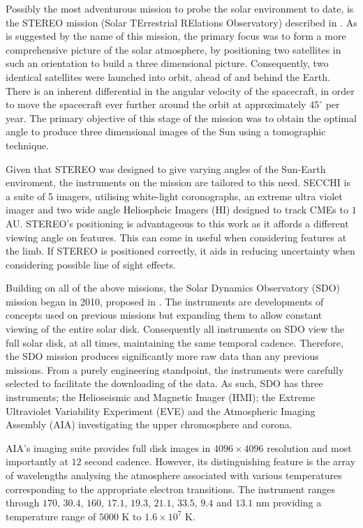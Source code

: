 Possibly the most adventurous mission to probe the solar environment to date, is the STEREO mission (Solar TErrestrial RElations Observatory) described in \cite{Kaiser2008}.
As is suggested by the name of this mission, the primary focus was to form a more comprehensive picture of the solar atmosphere, by positioning two satellites in such an orientation to build a three dimensional picture.
Consequently, two identical satellites were launched into orbit, ahead of and behind the Earth.
There is an inherent differential in the angular velocity of the spacecraft, in order to move the spacecraft ever further around the orbit at approximately $45^\circ$ per year.
The primary objective of this stage of the mission was to obtain the optimal angle to produce three dimensional images of the Sun using a tomographic technique.

Given that STEREO was designed to give varying angles of the Sun-Earth  enviroment, the instruments on the mission are tailored to this need.
SECCHI is a suite of 5 imagers, utilising white-light coronographs, an extreme ultra violet imager and two wide angle Heliospheic Imagers (HI) designed to track CMEs to $1$ AU.
STEREO's positioning is advantageous to this work as it affords a different viewing angle on features.
This can come in useful when considering features at the limb.
If STEREO is positioned correctly, it aids in reducing uncertainty when considering possible line of sight effects.

Building on all of the above missions, the Solar Dynamics Observatory (SDO) mission began in 2010, proposed in \cite{Pesnell2012}.
The instruments are developments of concepts used on previous missions but expanding them to allow constant viewing of the entire solar disk.
Consequently all instruments on SDO view the full solar disk, at all times, maintaining the same temporal cadence. 
Therefore, the SDO mission produces significantly more raw data than any previous missions.
From a purely engineering standpoint, the instruments were carefully selected to facilitate the downloading of the data.
As such, SDO has three instruments; the Helioseismic and Magnetic Imager (HMI); the Extreme Ultraviolet Variability Experiment (EVE) and the Atmospheric Imaging Assembly (AIA) investigating the upper chromosphere and corona.

AIA's imaging suite provides full disk images in $4096 \times 4096$ resolution and most importantly at $12$ second cadence.
However, its distinguishing feature is the array of wavelengths analysing the atmosphere \cite{AIAspec} associated with various temperatures corresponding to the appropriate electron transitions.
The instrument ranges through $170$, $30.4$, $160$, $17.1$, $19.3$, $21.1$, $33.5$, $9.4$ and $13.1$ nm providing a temperature range of $5000$ K to $1.6 \times 10^7$ K.

